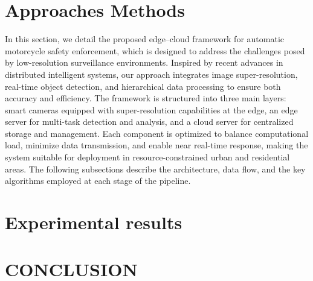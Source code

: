 \documentclass[conference]{IEEEtran}
\begin{document}
\section{Approaches Methods}
\label{sec:approaches}

In this section, we detail the proposed edge–cloud framework for automatic motorcycle safety enforcement, which is designed to address the challenges posed by low-resolution surveillance environments. Inspired by recent advances in distributed intelligent systems, our approach integrates image super-resolution, real-time object detection, and hierarchical data processing to ensure both accuracy and efficiency. The framework is structured into three main layers: smart cameras equipped with super-resolution capabilities at the edge, an edge server for multi-task detection and analysis, and a cloud server for centralized storage and management. Each component is optimized to balance computational load, minimize data transmission, and enable near real-time response, making the system suitable for deployment in resource-constrained urban and residential areas. The following subsections describe the architecture, data flow, and the key algorithms employed at each stage of the pipeline.

\section{Experimental results}

\section{CONCLUSION}
\end{document}
